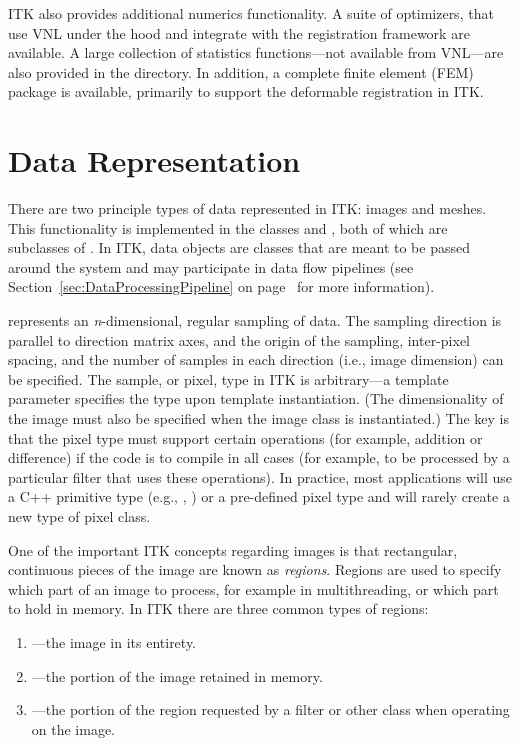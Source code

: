 ITK also provides additional numerics functionality. A suite of optimizers, that
use VNL under the hood and integrate with the registration framework
are available. A large collection of statistics functions---not available from
VNL---are also provided in the 
directory. In addition, a complete finite element (FEM) package is available,
primarily to support the deformable registration in ITK.


\section{Data Representation}
\label{sec:DataRepresentationAndAccess}


There are two principle types of data represented in ITK: images and
meshes. This functionality is implemented in the classes
 and , both of which are subclasses of
. In ITK, data objects are classes that are meant to
be passed around the system and may participate in data flow pipelines (see
Section~\ref{sec:DataProcessingPipeline} on
page~\pageref{sec:DataProcessingPipeline} for more information).



 represents an \emph{n}-dimensional, regular sampling of
data. The sampling direction is parallel to direction matrix axes, and
the origin of the sampling, inter-pixel spacing, and the number of samples in
each direction (i.e., image dimension) can be specified. The sample, or
pixel, type in ITK is arbitrary---a template parameter 
specifies the type upon template instantiation. (The dimensionality of the
image must also be specified when the image class is instantiated.) The key
is that the pixel type must support certain operations (for example, addition
or difference) if the code is to compile in all cases (for example, to be
processed by a particular filter that uses these operations). In practice,
most applications will use a C++ primitive type (e.g., , )
or a pre-defined pixel type and will rarely create a new type of pixel class.

One of the important ITK concepts regarding images is that rectangular,
continuous pieces of the image are known as \emph{regions}. Regions are used
to specify which part of an image to process, for example in multithreading,
or which part to hold in memory. In ITK there are three common types of
regions:
\begin{enumerate}
\item {}---the image in its entirety.
\item {}---the portion of the image retained in memory.
\item {}---the portion of the region requested by a
filter or other class when operating on the image.
\end{enumerate}

